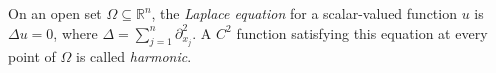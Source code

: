 
On an open set $\Omega\subseteq\mathbb R^n$, the \emph{Laplace equation} for a scalar-valued function $u$ is $\Delta u=0$, where $\Delta=\sum_{j=1}^n\partial_{x_j}^2$. A $C^2$ function satisfying this equation at every point of $\Omega$ is called \emph{harmonic}.

